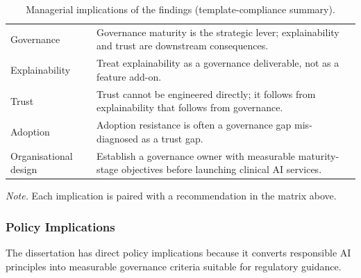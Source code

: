 {\tablestripes\tablefontsize
{}
\begin{xltabular}{\textwidth}{@{} >{\raggedright\arraybackslash}p{5cm} L @{}}
\caption[Managerial implications of the findings (template compliance)]{Managerial implications of the findings (template-compliance summary).}\label{tab:ch5_managerial_implications_compliance} \\
\toprule
{} &  \\
\midrule
\endfirsthead
\endhead
\bottomrule
\endlastfoot
Governance & Governance maturity is the strategic lever; explainability and trust are downstream consequences. \\
\addlinespace
Explainability & Treat explainability as a governance deliverable, not as a feature add-on. \\
\addlinespace
Trust & Trust cannot be engineered directly; it follows from explainability that follows from governance. \\
\addlinespace
Adoption & Adoption resistance is often a governance gap mis-diagnosed as a trust gap. \\
\addlinespace
Organisational design & Establish a governance owner with measurable maturity-stage objectives before launching clinical AI services. \\
\end{xltabular}}

\vspace{0.3em}\noindent\textit{Note.} Each implication is paired with a recommendation in the matrix above.


\subsubsection{Policy Implications}
\label{sec:ch5_policy_implications}

\noindent The dissertation has direct policy implications because it converts responsible AI principles into measurable governance criteria suitable for regulatory guidance.

